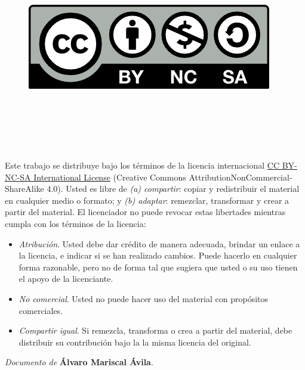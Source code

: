 
\cleardoublepage

\begin{figure}
 \ \ \ \ \includegraphics[width=0.25\linewidth]{figs/by-nc-sa.png}
 \label{fig:cc} 
 \end{figure}

\

\

\

\noindent
Este trabajo se distribuye bajo los términos de la licencia internacional \href{http://creativecommons.org/licenses/by-nc-sa/4.0/}{CC BY-NC-SA International License} (Creative Commons AttributionNonCommercial-ShareAlike 4.0). Usted es libre de \textit{(a) compartir}: copiar y redistribuir el material en cualquier medio o formato; y \textit{(b) adaptar}: remezclar, transformar y crear a partir del material. El licenciador no puede revocar estas libertades mientras cumpla con los términos de la licencia:

\begin{itemize}
\item \textit{Atribución}. Usted debe dar crédito de manera adecuada, brindar un enlace a la licencia, e indicar si se han realizado cambios. Puede hacerlo en cualquier forma razonable, pero no de forma tal que sugiera que usted o su uso tienen el apoyo de la licenciante.
\item \textit{No comercial}. Usted no puede hacer uso del material con propósitos comerciales.
\item \textit{Compartir igual}. Si remezcla, transforma o crea a partir del material, debe distribuir su contribución bajo la la misma licencia del original.
\end{itemize}

\begin{flushright}
		\vspace{7.0 cm}
		\emph{Documento de} \textbf{Álvaro Mariscal Ávila}. %
\end{flushright}

